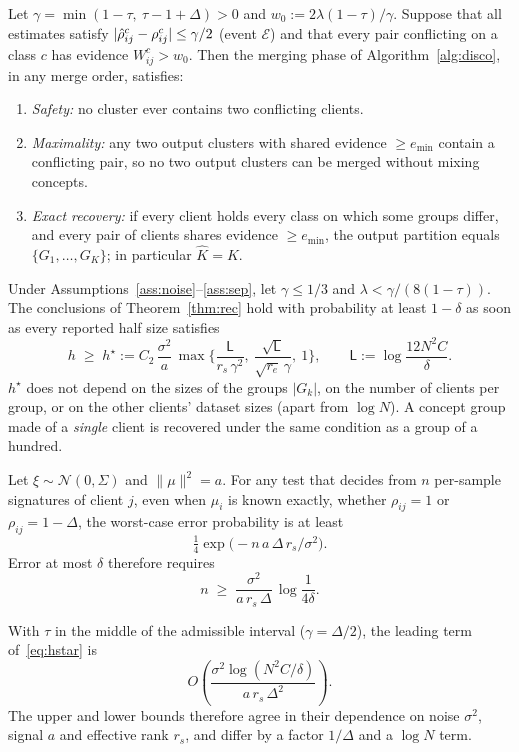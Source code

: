 \begin{theorem}\label{thm:rec}
Let $\gamma=\min(1-\tau,\ \tau-1+\Delta)>0$ and $w_0:=2\lambda(1-\tau)/\gamma$. Suppose that all estimates satisfy $|\hat\rho^c_{ij}-\rho^c_{ij}|\le\gamma/2$ (event $\mathcal E$) and that every pair conflicting on a class $c$ has evidence $W^c_{ij}>w_0$. Then the merging phase of Algorithm~\ref{alg:disco}, in any merge order, satisfies:
\begin{enumerate}[label=(\alph*),itemsep=0pt]
\item \emph{Safety:} no cluster ever contains two conflicting clients.
\item \emph{Maximality:} any two output clusters with shared evidence $\ge e_{\min}$ contain a conflicting pair, so no two output clusters can be merged without mixing concepts.
\item \emph{Exact recovery:} if every client holds every class on which some groups differ, and every pair of clients shares evidence $\ge e_{\min}$, the output partition equals $\{G_1,\ldots,G_K\}$; in particular $\hat K=K$.
\end{enumerate}
\end{theorem}

\begin{corollary}\label{cor:sc}
Under Assumptions~\ref{ass:noise}--\ref{ass:sep}, let $\gamma\le1/3$ and $\lambda<\gamma/(8(1-\tau))$. The conclusions of Theorem~\ref{thm:rec} hold with probability at least $1-\delta$ as soon as every reported half size satisfies
\begin{equation}\label{eq:hstar}
h\;\ge\;h^\star:=C_2\,\frac{\sigma^2}{a}\,
\max\Big\{\frac{\mathsf L}{r_s\,\gamma^2},\ \frac{\sqrt{\mathsf L}}{\sqrt{r_e}\,\gamma},\ 1\Big\},
\qquad \mathsf L:=\log\frac{12N^2C}{\delta}.
\end{equation}
$h^\star$ does not depend on the sizes of the groups $|G_k|$, on the number of clients per group, or on the other clients' dataset sizes (apart from $\log N$). A concept group made of a \emph{single} client is recovered under the same condition as a group of a hundred.
\end{corollary}

\begin{theorem}\label{thm:lb}
Let $\xi\sim\mathcal N(0,\Sigma)$ and $\|\mu\|^2=a$. For any test that decides from $n$ per-sample signatures of client $j$, even when $\mu_i$ is known exactly, whether $\rho_{ij}=1$ or $\rho_{ij}=1-\Delta$, the worst-case error probability is at least
\[
\tfrac14\exp\!\big(-n\,a\,\Delta\,r_s/\sigma^2\big).
\]
Error at most $\delta$ therefore requires
\[
n\;\ge\;\frac{\sigma^2}{a\,r_s\,\Delta}\,\log\frac1{4\delta}.
\]
\end{theorem}
With $\tau$ in the middle of the admissible interval ($\gamma=\Delta/2$), the leading term of~\eqref{eq:hstar} is
\[
O\!\left(\frac{\sigma^2\log(N^2C/\delta)}{a\,r_s\,\Delta^2}\right).
\]
The upper and lower bounds therefore agree in their dependence on noise $\sigma^2$, signal $a$ and effective rank $r_s$, and differ by a factor $1/\Delta$ and a $\log N$ term.


